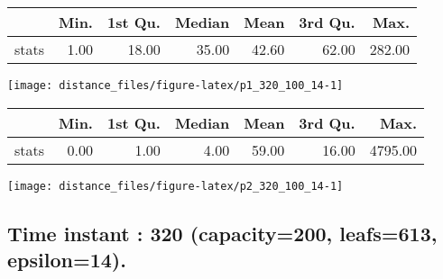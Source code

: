 \documentclass[
  9pt,
  landscape]{article}
\begin{document}
\begin{minipage}{0.5\textwidth} 
\centering 
\begin{tabular}{rrrrrrr}
  \hline
 & Min. & 1st Qu. & Median & Mean & 3rd Qu. & Max. \\ 
  \hline
stats & 1.00 & 18.00 & 35.00 & 42.60 & 62.00 & 282.00 \\ 
   \hline
\end{tabular}
\vspace{0.5cm} 


\texttt{[image: distance\_files/figure-latex/p1\_320\_100\_14-1]} 

\end{minipage} 
\begin{minipage}{0.5\textwidth} 
\centering 
\begin{tabular}{rrrrrrr}
  \hline
 & Min. & 1st Qu. & Median & Mean & 3rd Qu. & Max. \\ 
  \hline
stats & 0.00 & 1.00 & 4.00 & 59.00 & 16.00 & 4795.00 \\ 
   \hline
\end{tabular}
\vspace{0.5cm} 


\texttt{[image: distance\_files/figure-latex/p2\_320\_100\_14-1]} 

\end{minipage}

\pagebreak

\hypertarget{time-instant-320-capacity200-leafs613-epsilon14.}{%
\subsection{Time instant : 320 (capacity=200, leafs=613,
epsilon=14).}\label{time-instant-320-capacity200-leafs613-epsilon14.}}
\end{document}
